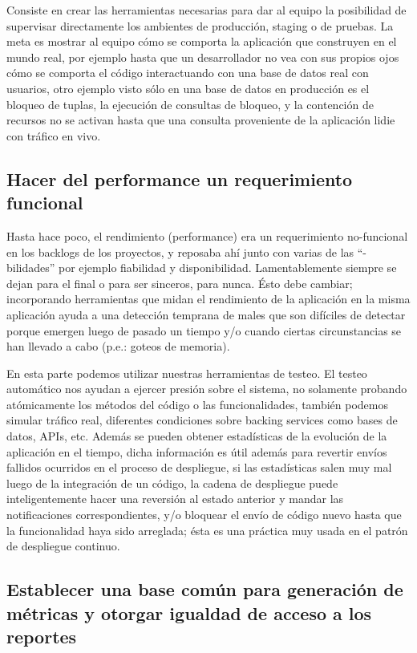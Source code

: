 \documentclass[conference]{IEEEtran}
\begin{document}
Consiste en crear las herramientas necesarias para dar al equipo la posibilidad de supervisar directamente los ambientes de producción, staging o de pruebas. La meta es mostrar al equipo cómo se comporta la aplicación que construyen en el mundo real, por ejemplo hasta que un desarrollador no vea con sus propios ojos cómo se comporta el código interactuando con una base de datos real con usuarios, otro ejemplo visto sólo en una base de datos en producción es el bloqueo de tuplas, la ejecución de consultas de bloqueo, y la contención de recursos no se activan hasta que una consulta proveniente de la aplicación lidie con tráfico en vivo.

\subsection{Hacer del performance un requerimiento funcional}

Hasta hace poco, el rendimiento (performance) era un requerimiento no-funcional en los backlogs de los proyectos, y reposaba ahí junto con varias de las “-bilidades” por ejemplo fiabilidad y disponibilidad. Lamentablemente siempre se dejan para el final o para ser sinceros, para nunca. Ésto debe cambiar; incorporando herramientas que midan el rendimiento de la aplicación en la misma aplicación ayuda a una detección temprana de males que son difíciles de detectar porque emergen luego de pasado un tiempo y/o cuando ciertas circunstancias se han llevado a cabo (p.e.: goteos de memoria). 

En esta parte podemos utilizar nuestras herramientas de testeo. El testeo automático nos ayudan a ejercer presión sobre el sistema, no solamente probando atómicamente los métodos del código o las funcionalidades,  también podemos simular tráfico real, diferentes condiciones sobre backing services como bases de datos, APIs, etc. Además se pueden obtener estadísticas de la evolución de la aplicación en el tiempo, dicha información es útil además para revertir envíos fallidos ocurridos en el proceso de despliegue, si las estadísticas salen muy mal luego de la integración de un código, la cadena de despliegue puede inteligentemente hacer una reversión al estado anterior y mandar las notificaciones correspondientes, y/o bloquear el envío de código nuevo hasta que la funcionalidad haya sido arreglada; ésta es una práctica muy usada en el patrón de despliegue continuo.

\subsection{Establecer una base común para generación de métricas y otorgar igualdad de acceso a los reportes}
\end{document}
